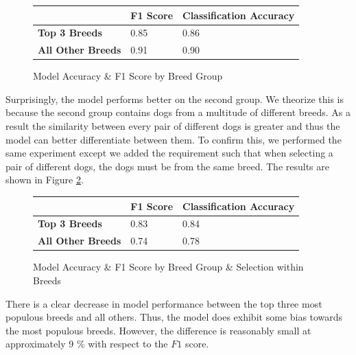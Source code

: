 \documentclass{article}
\begin{document}
\begin{figure}[h]

\begin{center}

\begin{tabular}{|l|l|l|}
\hline
                          & \textbf{F1 Score} & \textbf{Classification Accuracy} \\ \hline
\textbf{Top 3 Breeds}     & 0.85        & 0.86              \\ \hline
\textbf{All Other Breeds} & 0.91        & 0.90              \\ \hline
\end{tabular}
\end{center}


\caption{Model Accuracy \& F1 Score by Breed Group}
\label{fig:x breed score}
\end{figure}

\noindent Surprisingly, the model performs better on the second group.  We theorize this is because the second group contains dogs from a multitude of different breeds.   As a result the similarity between every pair of different dogs is greater and thus the model can better differentiate between them.  To confirm this, we performed the same experiment except we added the requirement such that when selecting a pair of different dogs, the dogs must be from the same breed.  The results are shown in Figure \ref{fig:x breed score in breed}.

\begin{figure}[h]

\begin{center}

\begin{tabular}{|l|l|l|}
\hline
                          & \textbf{F1 Score} & \textbf{Classification Accuracy} \\ \hline
\textbf{Top 3 Breeds}     & 0.83        & 0.84              \\ \hline
\textbf{All Other Breeds} & 0.74        & 0.78              \\ \hline
\end{tabular}
\end{center}
\caption{Model Accuracy \& F1 Score by Breed Group & Selection within Breeds}
\label{fig:x breed score in breed}
\end{figure}

\noident  There is a clear decrease in model performance between the top three most populous breeds and all others.  Thus, the model does exhibit some bias towards the most populous breeds.  However, the difference is reasonably small at approximately 9 \% with respect to the $F1$ score.
\end{document}
